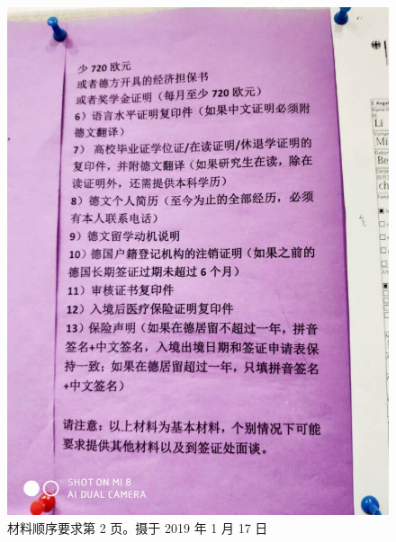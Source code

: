\documentclass[oneside,final]{book}
\begin{document}
\begin{appendices}
\begin{figure}[htbp]
  \includegraphics[width=\textwidth]{order-2}
  \caption{材料顺序要求第 2 页。摄于 2019 年 1 月 17 日}
  \label{fig:order-2}
\end{figure}
\begin{figure}[htbp]
  \centering

\end{figure}
\end{appendices}
\end{document}
